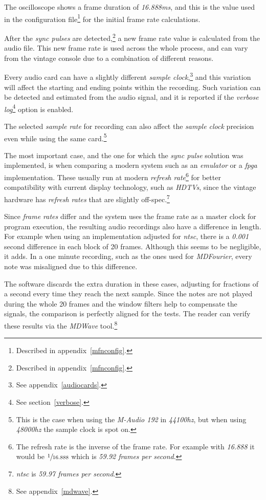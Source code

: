 \documentclass[10pt,a4paper]{report}
\newcommand{\ac}[1]{\textit{\mbox{\acrshort{#1}}}}
\newcommand{\hz}[1]{\textit{\mbox{#1\acrshort{hz}}}}
\begin{document}
\begin{appendices}
The oscilloscope shows a frame duration of \textit{16.888}\ac{ms}, and this is the value used in the configuration file\footnote{Described in appendix~\ref{mfnconfig}.} for the initial frame rate calculations.

After the \textit{sync pulses} are detected,\footnote{Described in appendix~\ref{mfnconfig}.} a new frame rate value is calculated from the audio file. This new frame rate is used across the whole process, and can vary from the vintage console due to a combination of different reasons.

Every audio card can have a slightly different \textit{sample clock},\footnote{See appendix~\ref{audiocards}.} and this variation will affect the starting and ending points within the recording. Such variation can be detected and estimated from the audio signal, and it is reported if the \textit{verbose log}\footnote{See section~\ref{verbose}.} option is enabled.

The selected \textit{sample rate} for recording can also affect the \textit{sample clock} precision even while using the same card.\footnote{This is the case when using the \textit{M-Audio 192} \cite{maudio} in \hz{44100}, but when using \hz{48000} the sample clock is spot on.}

The most important case, and the one for which the \textit{sync pulse} solution was implemented, is when comparing a modern system such as an \textit{emulator} or a \ac{fpga} implementation. These usually run at modern \textit{refresh rate}\footnote{The refresh rate is the inverse of the frame rate. For example with \textit{16.888} it would be $\sfrac{1}{16.888}$ which is \textit{59.92 frames per second}.} for better compatibility with current display technology, such as \textit{HDTVs}, since the vintage hardware has \textit{refresh rates} that are slightly off-spec.\footnote{\ac{ntsc} is \textit{59.97 frames per second}.}

Since \textit{frame rates} differ and the system uses the frame rate as a master clock for program execution, the resulting audio recordings also have a difference in length. For example when using an implementation adjusted for \ac{ntsc}, there is a \textit{0.001} second difference in each block of 20 frames. Although this seems to be negligible, it adds. In a one minute recording, such as the ones used for \textit{MDFourier}, every note was misaligned due to this difference.

The software discards the extra duration in these cases, adjusting for fractions of a second every time they reach the next sample. Since the notes are not played during the whole 20 frames and the window filters help to compensate the signals, the comparison is perfectly aligned for the tests. The reader can verify these results via the \textit{MDWave} tool.\footnote{See appendix~\ref{mdwave}.}


\end{appendices}
\end{document}
